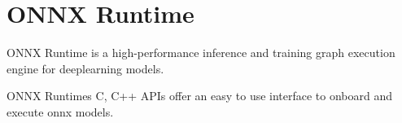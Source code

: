 \chapter{ONNX Runtime}
\hypertarget{index}{}\label{index}
ONNX Runtime is a high-\/performance inference and training graph execution engine for deeplearning models.

ONNX Runtime\textquotesingle{}s C, C++ APIs offer an easy to use interface to onboard and execute onnx models.
\begin{DoxyItemize}
\item {}
\item {} 
\end{DoxyItemize}


